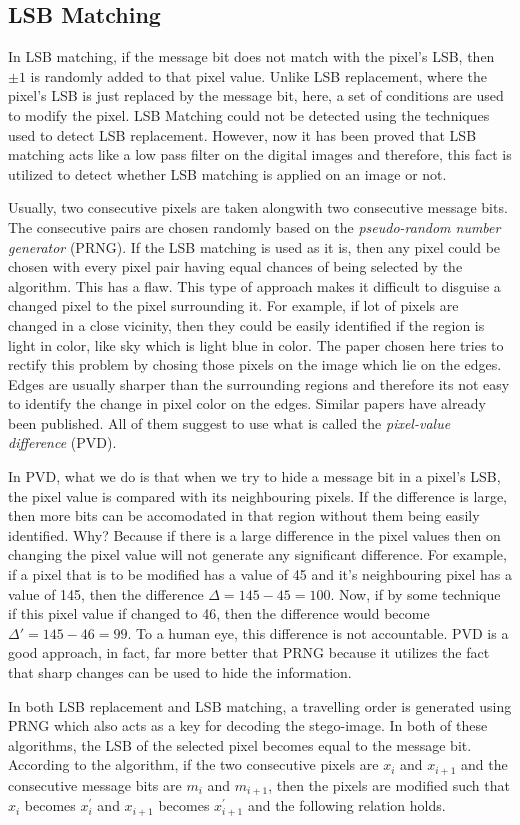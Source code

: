 \documentclass{report}
\begin{document}
\subsection{LSB Matching}
In LSB matching, if the message bit does not match with the pixel's LSB, then $\pm 1$ is randomly added to that pixel value. Unlike LSB replacement, where the pixel's LSB is just replaced by the message bit, here, a set of conditions are used to modify the pixel. LSB Matching could not be detected using the techniques used to detect LSB replacement. However, now it has been proved that LSB matching acts like a low pass filter on the digital images and therefore, this fact is utilized to detect whether LSB matching is applied on an image or not. \par Usually, two consecutive pixels are taken alongwith two consecutive message bits. The consecutive pairs are chosen randomly based on the {\it pseudo-random number generator} (PRNG). If the LSB matching is used as it is, then any pixel could be chosen with every pixel pair having equal chances of being selected by the algorithm. This has a flaw. This type of approach makes it difficult to disguise a changed pixel to the pixel surrounding it. For example, if lot of pixels are changed in a close vicinity, then they could be easily identified if the region is light in color, like sky which is light blue in color. The paper chosen here tries to rectify this problem by chosing those pixels on the image which lie on the edges. Edges are usually sharper than the surrounding regions and therefore its not easy to identify the change in pixel color on the edges. Similar papers have already been published. All of them suggest to use what is called the {\it pixel-value difference} (PVD). \par In PVD, what we do is that when we try to hide a message bit in a pixel's LSB, the pixel value is compared with its neighbouring pixels. If the difference is large, then more bits can be accomodated in that region without them being easily identified. Why? Because if there is a large difference in the pixel values then on changing the pixel value will not generate any significant difference. For example, if a pixel that is to be modified has a value of 45 and it's neighbouring pixel has a value of 145, then the difference $\displaystyle \Delta = 145-45=100$. Now, if by some technique if this pixel value if changed to 46, then the difference would become $\displaystyle \Delta' = 145-46 = 99$. To a human eye, this difference is not accountable. PVD is a good approach, in fact, far more better that PRNG because it utilizes the fact that sharp changes can be used to hide the information. \par In both LSB replacement and LSB matching, a travelling order is generated using PRNG which also acts as a key for decoding the stego-image. In both of these algorithms, the LSB of the selected pixel becomes equal to the message bit. According to the algorithm, if the two consecutive pixels are $x_{i}$ and $x_{i+1}$ and the consecutive message bits are $m_{i}$ and $m_{i+1}$, then the pixels are modified such that $x_{i}$ becomes $x_{i}^{'}$ and $x_{i+1}$ becomes $x_{i+1}^{'}$ and the following relation holds.
\end{document}
